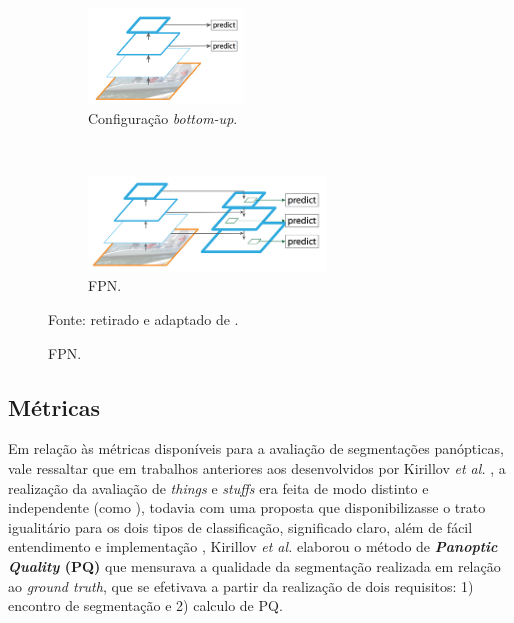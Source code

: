 \begin{figure}[H]
   \caption{Extrações de características e FPN.}
   \centering
   \label{panoptic:fig:2}
    \begin{subfigure}[t]{0.45\textwidth}
        \centering
        \includegraphics[height=1in]{recursos/imagens/panoptic/bottom-up.png}
        \caption{Configuração \textit{bottom-up}.}
        \label{panoptic:fig:2.1}
    \end{subfigure}%
    ~ 
    \begin{subfigure}[t]{0.45\textwidth}
        \centering
        \includegraphics[height=1in]{recursos/imagens/panoptic/FPN.png}
        \caption{FPN.}
        \label{panoptic:fig:2.2}
    \end{subfigure}%

    \vspace*{1 cm}
    Fonte: retirado e adaptado de \cite{Lin2016}.
\end{figure}


\subsection{Métricas}
\label{panoptic:metrics}
Em relação às métricas disponíveis para a avaliação de segmentações panópticas, vale ressaltar que em trabalhos anteriores aos desenvolvidos por Kirillov \textit{et al.} \cite{Kirillov2019a}, a realização da avaliação de \textit{things} e \textit{stuffs} era feita de modo distinto e independente (como \cite{Sun2014, Yao2012}), todavia com uma proposta que disponibilizasse o trato igualitário para os dois tipos de classificação, significado claro, além de fácil entendimento e implementação , Kirillov \textit{et al.} \cite{Kirillov2019a} elaborou o método de \textbf{\textit{Panoptic Quality} (PQ)} que mensurava a qualidade da segmentação realizada em relação ao \textit{ground truth}, que se efetivava  a partir da realização de dois requisitos: 1) encontro de segmentação e  2) calculo de PQ.

